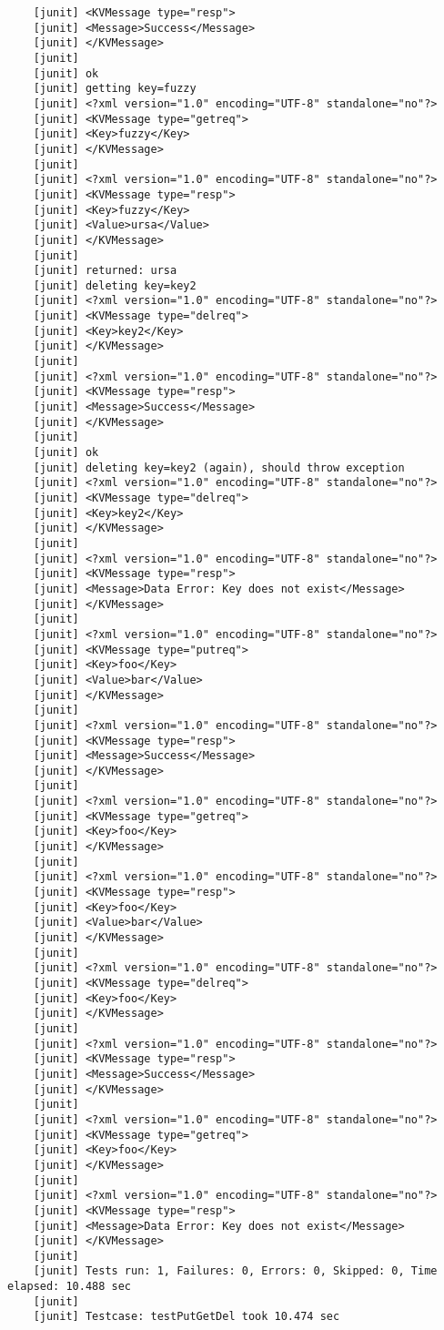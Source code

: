 \documentclass{article}
\begin{document}
\begin{lstlisting}
    [junit] <KVMessage type="resp">
    [junit] <Message>Success</Message>
    [junit] </KVMessage>
    [junit] 
    [junit] ok
    [junit] getting key=fuzzy
    [junit] <?xml version="1.0" encoding="UTF-8" standalone="no"?>
    [junit] <KVMessage type="getreq">
    [junit] <Key>fuzzy</Key>
    [junit] </KVMessage>
    [junit] 
    [junit] <?xml version="1.0" encoding="UTF-8" standalone="no"?>
    [junit] <KVMessage type="resp">
    [junit] <Key>fuzzy</Key>
    [junit] <Value>ursa</Value>
    [junit] </KVMessage>
    [junit] 
    [junit] returned: ursa
    [junit] deleting key=key2
    [junit] <?xml version="1.0" encoding="UTF-8" standalone="no"?>
    [junit] <KVMessage type="delreq">
    [junit] <Key>key2</Key>
    [junit] </KVMessage>
    [junit] 
    [junit] <?xml version="1.0" encoding="UTF-8" standalone="no"?>
    [junit] <KVMessage type="resp">
    [junit] <Message>Success</Message>
    [junit] </KVMessage>
    [junit] 
    [junit] ok
    [junit] deleting key=key2 (again), should throw exception
    [junit] <?xml version="1.0" encoding="UTF-8" standalone="no"?>
    [junit] <KVMessage type="delreq">
    [junit] <Key>key2</Key>
    [junit] </KVMessage>
    [junit] 
    [junit] <?xml version="1.0" encoding="UTF-8" standalone="no"?>
    [junit] <KVMessage type="resp">
    [junit] <Message>Data Error: Key does not exist</Message>
    [junit] </KVMessage>
    [junit] 
    [junit] <?xml version="1.0" encoding="UTF-8" standalone="no"?>
    [junit] <KVMessage type="putreq">
    [junit] <Key>foo</Key>
    [junit] <Value>bar</Value>
    [junit] </KVMessage>
    [junit] 
    [junit] <?xml version="1.0" encoding="UTF-8" standalone="no"?>
    [junit] <KVMessage type="resp">
    [junit] <Message>Success</Message>
    [junit] </KVMessage>
    [junit] 
    [junit] <?xml version="1.0" encoding="UTF-8" standalone="no"?>
    [junit] <KVMessage type="getreq">
    [junit] <Key>foo</Key>
    [junit] </KVMessage>
    [junit] 
    [junit] <?xml version="1.0" encoding="UTF-8" standalone="no"?>
    [junit] <KVMessage type="resp">
    [junit] <Key>foo</Key>
    [junit] <Value>bar</Value>
    [junit] </KVMessage>
    [junit] 
    [junit] <?xml version="1.0" encoding="UTF-8" standalone="no"?>
    [junit] <KVMessage type="delreq">
    [junit] <Key>foo</Key>
    [junit] </KVMessage>
    [junit] 
    [junit] <?xml version="1.0" encoding="UTF-8" standalone="no"?>
    [junit] <KVMessage type="resp">
    [junit] <Message>Success</Message>
    [junit] </KVMessage>
    [junit] 
    [junit] <?xml version="1.0" encoding="UTF-8" standalone="no"?>
    [junit] <KVMessage type="getreq">
    [junit] <Key>foo</Key>
    [junit] </KVMessage>
    [junit] 
    [junit] <?xml version="1.0" encoding="UTF-8" standalone="no"?>
    [junit] <KVMessage type="resp">
    [junit] <Message>Data Error: Key does not exist</Message>
    [junit] </KVMessage>
    [junit] 
    [junit] Tests run: 1, Failures: 0, Errors: 0, Skipped: 0, Time elapsed: 10.488 sec
    [junit] 
    [junit] Testcase: testPutGetDel took 10.474 sec
\end{lstlisting}
\end{document}
